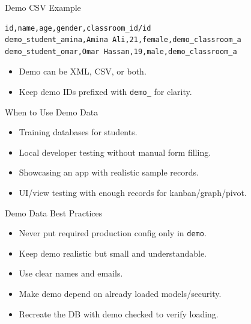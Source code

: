 \begin{frame}[fragile]{Demo CSV Example}
\begin{lstlisting}
id,name,age,gender,classroom_id/id
demo_student_amina,Amina Ali,21,female,demo_classroom_a
demo_student_omar,Omar Hassan,19,male,demo_classroom_a
\end{lstlisting}
	\begin{itemize}
		\item Demo can be XML, CSV, or both.
		\item Keep demo IDs prefixed with \texttt{demo\_} for clarity.
	\end{itemize}
\end{frame}

\begin{frame}{When to Use Demo Data}
	\begin{itemize}
		\item Training databases for students.
		\item Local developer testing without manual form filling.
		\item Showcasing an app with realistic sample records.
		\item UI/view testing with enough records for kanban/graph/pivot.
	\end{itemize}
\end{frame}

\begin{frame}{Demo Data Best Practices}
	\begin{itemize}
		\item Never put required production config only in \texttt{demo}.
		\item Keep demo realistic but small and understandable.
		\item Use clear names and emails.
		\item Make demo depend on already loaded models/security.
		\item Recreate the DB with demo checked to verify loading.
	\end{itemize}
\end{frame}
